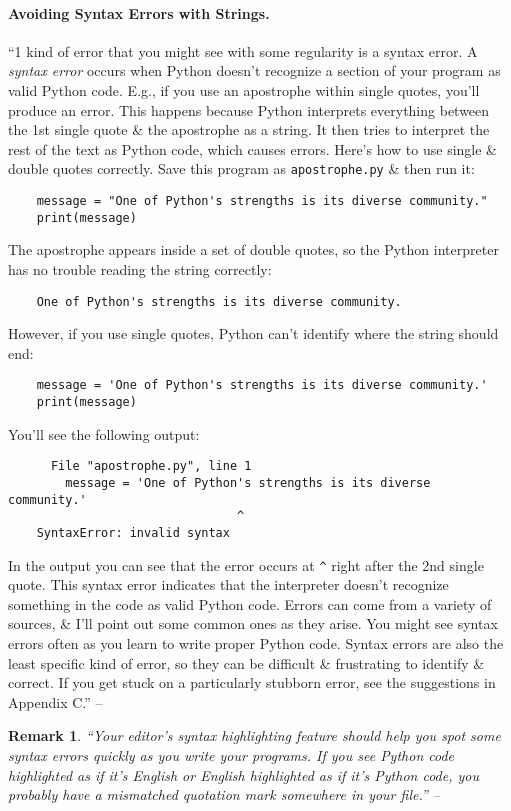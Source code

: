 \documentclass[oneside]{book}
\numberwithin{equation}{section}
\newtheorem{remark}{Remark}[chapter]
\begin{document}
\paragraph{Avoiding Syntax Errors with Strings.} ``1 kind of error that you might see with some regularity is a syntax error. A \textit{syntax error} occurs when Python doesn't recognize a section of your program as valid Python code. E.g., if you use an apostrophe within single quotes, you'll produce an error. This happens because Python interprets everything between the 1st single quote \& the apostrophe as a string. It then tries to interpret the rest of the text as Python code, which causes errors. Here's how to use single \& double quotes correctly. Save this program as \texttt{apostrophe.py} \& then run it:
\begin{verbatim}
	message = "One of Python's strengths is its diverse community."
	print(message)
\end{verbatim}
The apostrophe appears inside a set of double quotes, so the Python interpreter has no trouble reading the string correctly:
\begin{verbatim}
	One of Python's strengths is its diverse community.
\end{verbatim}
However, if you use single quotes, Python can't identify where the string should end:
\begin{verbatim}
	message = 'One of Python's strengths is its diverse community.'
	print(message)
\end{verbatim}
You'll see the following output:
\begin{verbatim}
	  File "apostrophe.py", line 1
	    message = 'One of Python's strengths is its diverse community.'
	                            ^
	SyntaxError: invalid syntax
\end{verbatim}
In the output you can see that the error occurs at \verb|^| right after the 2nd single quote. This syntax error indicates that the interpreter doesn't recognize something in the code as valid Python code. Errors can come from a variety of sources, \& I'll point out some common ones as they arise. You might see syntax errors often as you learn to write proper Python code. Syntax errors are also the least specific kind of error, so they can be difficult \& frustrating to identify \& correct. If you get stuck on a particularly stubborn error, see the suggestions in Appendix C.'' -- \cite[p. 24]{Matthes2019}

\begin{remark}
	``Your editor's syntax highlighting feature should help you spot some syntax errors quickly as you write your programs. If you see Python code highlighted as if it's English or English highlighted as if it's Python code, you probably have a mismatched quotation mark somewhere in your file.'' -- \cite[p. 25]{Matthes2019}
\end{remark}
\end{document}
